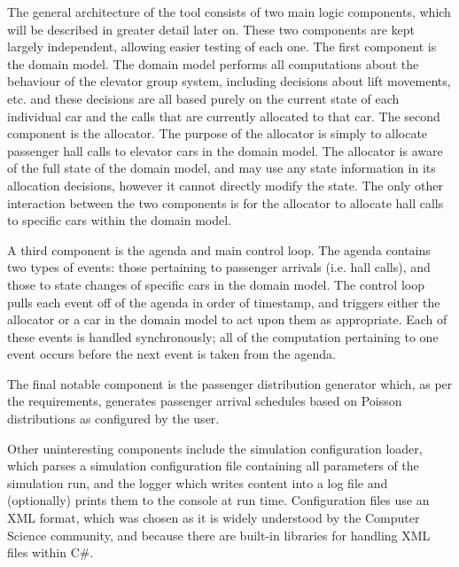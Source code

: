 \documentclass{UoYCSproject}
\begin{document}
The general architecture of the tool consists of two main logic components, which will be described in greater detail later on.  These two components are kept largely independent, allowing easier testing of each one.  The first component is the domain model.  The domain model performs all computations about the behaviour of the elevator group system, including decisions about lift movements, etc. and these decisions are all based purely on the current state of each individual car and the calls that are currently allocated to that car.  The second component is the allocator.  The purpose of the allocator is simply to allocate passenger hall calls to elevator cars in the domain model.  The allocator is aware of the full state of the domain model, and may use any state information in its allocation decisions, however it cannot directly modify the state.  The only other interaction between the two components is for the allocator to allocate hall calls to specific cars within the domain model.

A third component is the agenda and main control loop.  The agenda contains two types of events: those pertaining to passenger arrivals (i.e. hall calls), and those to state changes of specific cars in the domain model.  The control loop pulls each event off of the agenda in order of timestamp, and triggers either the allocator or a car in the domain model to act upon them as appropriate.  Each of these events is handled synchronously; all of the computation pertaining to one event occurs before the next event is taken from the agenda.

The final notable component is the passenger distribution generator which, as per the requirements, generates passenger arrival schedules based on Poisson distributions as configured by the user.

Other uninteresting components include the simulation configuration loader, which parses a simulation configuration file containing all parameters of the simulation run, and the logger which writes content into a log file and (optionally) prints them to the console at run time.  Configuration files use an XML format, which was chosen as it is widely understood by the Computer Science community, and because there are built-in libraries for handling XML files within C\#.
\end{document}
